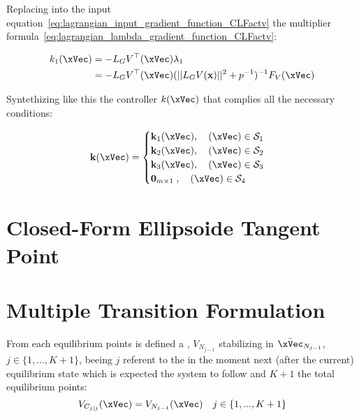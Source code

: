 Replacing into the input equation~\ref{eq:lagrangian_input_gradient_function_CLFactv} the  multiplier formula~\ref{eq:lagrangian_lambda_gradient_function_CLFactv}:

\begin{align}
    k_1(\xVec)  &= -L_GV^{\top}(\xVec) \lambda_1 \notag \\
    &= -L_GV^{\top}(\xVec) (||L_GV(\mathbf{x})||^2 + p^{-1})^{-1} F_V(\xVec) \label{eq:CLFConstraintsActvController} 
\end{align}

Syntethizing like this the controller \(k(\xVec)\) that complies all the necessary conditions:

\begin{equation}
    \mathbf{k}(\xVec ) =
    \begin{cases}
        \mathbf{k}_1(\xVec ), \quad (\xVec ) \in \mathcal{S}_1 \\
        \mathbf{k}_2(\xVec ), \quad (\xVec ) \in \mathcal{S}_2 \\
        \mathbf{k}_3(\xVec ), \quad (\xVec ) \in \mathcal{S}_3 \\
        \mathbf{0}_{m \times 1 }   \hspace{0.25em}, \quad (\xVec ) \in \mathcal{S}_4
    \end{cases}
    \label{eq:closed-form_controller_deduc}
\end{equation}





\section{Closed-Form Ellipsoide Tangent Point }
\label{app:CL_Ellipsoide_Tangent_Point}



\section{Multiple  Transition Formulation}
\label{app:M_CLF_Transition_Formulation}

From each equilibrium points is defined a , \(V_{N_{j-1}}\) stabilizing in \(\bar{\xVec}_{N_{j-1}}\), \(j \in \{1,...,K+1\}\), beeing \(j\) referent to the in the moment next (after the current) equilibrium state which is expected the system to follow and \(K+1\) the total equilibrium points:
\begin{equation}
    V_{C_{j|j}}(\xVec) = V_{N_{j-1}}(\xVec) \quad j \in \{1,...,K+1\}
    \label{eq:New_M-CLF-S_starting_Condition}
\end{equation}


